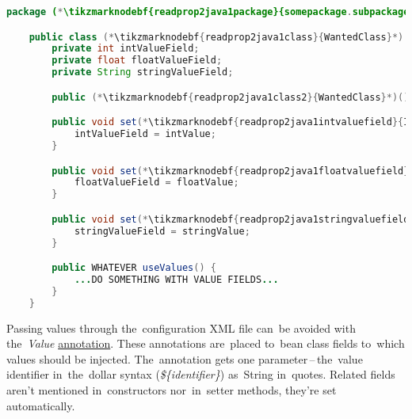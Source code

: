 \begin{lstlisting}[language=Java, title={Wanted class with the zero--parameter constructor and setter methods}]
    package (*\tikzmarknodebf{readprop2java1package}{somepackage.subpackage}*);

    public class (*\tikzmarknodebf{readprop2java1class}{WantedClass}*) implements WantedInterface {
        private int intValueField;
        private float floatValueField;
        private String stringValueField;

        public (*\tikzmarknodebf{readprop2java1class2}{WantedClass}*)() {}

        public void set(*\tikzmarknodebf{readprop2java1intvaluefield}{IntValueField}*)(int intValue) {
            intValueField = intValue;
        }

        public void set(*\tikzmarknodebf{readprop2java1floatvaluefield}{FloatValueField}*)(float floatValue) {
            floatValueField = floatValue;
        }

        public void set(*\tikzmarknodebf{readprop2java1stringvaluefield}{StringValueField}*)(string stringValue) {
            stringValueField = stringValue;
        }

        public WHATEVER useValues() {
            ...DO SOMETHING WITH VALUE FIELDS...
        }
    }
\end{lstlisting}
\newpage

\label{readingpropertiesannotations}
Passing values through the~configuration XML file can~be avoided with the~\textit{Value} \hyperref[javaannotation]{annotation}. These annotations are~placed to~bean class fields to~which values should be injected. The~annotation gets one parameter\,--\,the~value identifier in~the~dollar syntax (\textit{\$\{identifier\}}) as~String in~quotes. Related fields aren't mentioned in~constructors nor~in~setter methods, they're set automatically.

